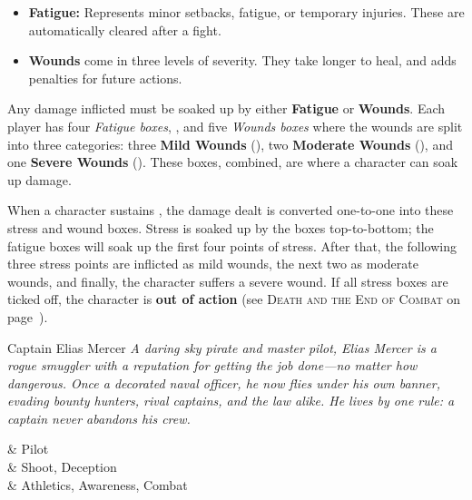 \begin{multicols}{2}
\begin{Example}
	\begin{itemize}\raggedright
    	\item \textbf{Fatigue:} Represents minor setbacks, fatigue, or temporary injuries. These are automatically cleared after a fight.
	    \item \textbf{Wounds} come in three levels of severity. They take longer to heal, and adds penalties for future actions.
	\end{itemize}
\end{Example}

Any damage inflicted must be soaked up by either \textbf{Fatigue} or \textbf{Wounds}. Each player has four \emph{Fatigue boxes}, \FatigueBoxes, and five \emph{Wounds boxes} where the wounds are split into three categories: three \textbf{Mild Wounds} (\MildWounds), two \textbf{Moderate Wounds} (\ModerateWounds), and one \textbf{Severe Wounds} (\SevereWounds). These boxes, combined, are where a character can soak up damage.

\DamageBox

When a character sustains \Damage, the damage dealt is converted one-to-one into these stress and wound boxes. Stress is soaked up by the boxes top-to-bottom; the fatigue boxes will soak up the first four points of stress. After that, the following three stress points are inflicted as mild wounds, the next two as moderate wounds, and finally, the character suffers a severe wound. If all stress boxes are ticked off, the character is \textbf{out of action} (see \textsc{Death and the End of Combat} on page~).

\begin{NPC}{Captain Elias Mercer}
	\emph{A daring sky pirate and master pilot, Elias Mercer is a rogue smuggler with a reputation for getting the job done—no matter how dangerous. Once a decorated naval officer, he now flies under his own banner, evading bounty hunters, rival captains, and the law alike. He lives by one rule: a captain never abandons his crew.}
  
	\vspace{0.5\baselineskip}

	\begin{SkillsBox}
		\Expert  & Pilot \\
		\Skilled & Shoot, Deception \\
		\Novice  & Athletics, Awareness, Combat \\
	\end{SkillsBox}
  

\end{NPC}
\end{multicols}
